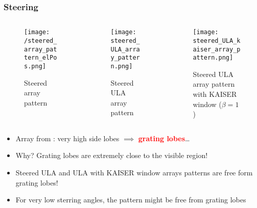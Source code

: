 \documentclass[UKenglish,8pt,aspectratio=1610]{beamer}
\begin{document}
\begin{frame}
	\frametitle{Steering}
	\begin{columns}
		
		\begin{column}{0.33\textwidth}
			\vspace{-15pt}
			\begin{figure}[h!]
				\texttt{[image: /steered\_array\_pattern\_elPos.png]}
				\centering
				\caption{Steered array pattern \cite{Nonuniformly_spaced_linear}}
			\end{figure}
			
			
		\end{column}
		
		\begin{column}{0.33\textwidth}
			\vspace{-15pt}
			\begin{figure}[h!]
				\texttt{[image: steered\_ULA\_array\_pattern.png]}
				\centering
				\caption{Steered ULA  array pattern}
			\end{figure}
		\end{column}
	
		\begin{column}{0.33\textwidth}
		\vspace{-20pt}
		\begin{figure}[h!]
			\texttt{[image: steered\_ULA\_kaiser\_array\_pattern.png]}
			\centering
			\caption{Steered ULA  array pattern with \textsc{KAISER} window ($\beta=1$)}
		\end{figure}
	\end{column}

	\end{columns}
\begin{itemize}
	\item Array from \cite{Nonuniformly_spaced_linear} :  very high side lobes $\implies$ \textcolor{red}{\textbf{grating lobes}}\dots 
    \item Why? Grating lobes are extremely close to the visible region! 
	\item Steered ULA and ULA with \textsc{KAISER} window arrays patterns are free form grating lobes!
	\item \textcolor{red}{\faHandPointRight} For very low sterring angles, the pattern might be free from grating lobes
\end{itemize}
\end{frame}
\end{document}
